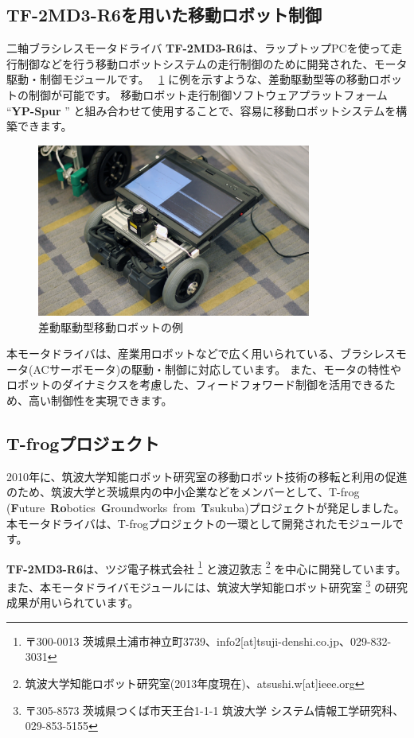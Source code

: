 \documentclass[11pt,a4j,openany]{jbook}
\begin{document}
\subsection{{\bf TF-2MD3-R6}を用いた移動ロボット制御}
二軸ブラシレスモータドライバ {\bf TF-2MD3-R6}は、ラップトップPCを使って走行制御などを行う移動ロボットシステムの走行制御のために開発された、モータ駆動・制御モジュールです。
\figurename~\ref{fig:example_robot} に例を示すような、差動駆動型等の移動ロボットの制御が可能です。
移動ロボット走行制御ソフトウェアプラットフォーム ``{\bf YP-Spur} '' と組み合わせて使用することで、容易に移動ロボットシステムを構築できます。\par
\begin{figure}[H]
\centering\includegraphics[width=90mm]{icart-mini.eps}
\caption{差動駆動型移動ロボットの例}
\label{fig:example_robot}
\end{figure}

 本モータドライバは、産業用ロボットなどで広く用いられている、ブラシレスモータ(ACサーボモータ)の駆動・制御に対応しています。
また、モータの特性やロボットのダイナミクスを考慮した、フィードフォワード制御を活用できるため、高い制御性を実現できます。\par

\subsection{T-frogプロジェクト}
 2010年に、筑波大学知能ロボット研究室の移動ロボット技術の移転と利用の促進のため、筑波大学と茨城県内の中小企業などをメンバーとして、T-frog ({\bf{F}}uture~{\bf{Ro}}botics~{\bf{G}}roundworks~from~{\bf{T}}sukuba)プロジェクトが発足しました。
本モータドライバは、T-frogプロジェクトの一環として開発されたモジュールです。\par

{\bf TF-2MD3-R6}は、ツジ電子株式会社
\footnote{ 〒300-0013 茨城県土浦市神立町3739、info2[at]tsuji-denshi.co.jp、029-832-3031}
と渡辺敦志
\footnote{ 筑波大学知能ロボット研究室(2013年度現在)、atsushi.w[at]ieee.org}
を中心に開発しています。
また、本モータドライバモジュールには、筑波大学知能ロボット研究室
\footnote{ 〒305-8573 茨城県つくば市天王台1-1-1 筑波大学 システム情報工学研究科、029-853-5155}
の研究成果が用いられています。\par
\end{document}
